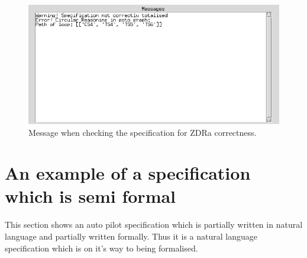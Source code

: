 \begin{figure}[H]
\includegraphics[scale=0.7]{examples/nonworkzdra/incorrect.png}
\caption{Message when checking the specification for ZDRa correctness. \label{app:failzdraoutmessgae}}
\end{figure}

\section{An example of a specification which is semi formal}
\label{app:semiform}
This section shows an auto pilot specification which is partially written in natural language and partially written formally. Thus it is a natural language specification which is on it's way to being formalised.

%
